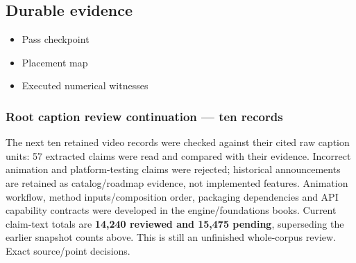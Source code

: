 \subsection{Durable evidence}\label{appendix-5056f3debc1f-durable-evidence}

\hypertarget{appendix-5056f3debc1f-durable-evidence}{}

\begin{itemize}
\tightlist
\item
  {Pass checkpoint}
\item
  {Placement map}
\item
  {Executed numerical witnesses}
\end{itemize}

\subsubsection{Root caption review continuation --- ten records}\label{appendix-5056f3debc1f-root-caption-review-continuation-ten-records}

\hypertarget{appendix-5056f3debc1f-root-caption-review-continuation-ten-records}{}

The next ten retained video records were checked against their cited raw caption units: 57 extracted claims were read and compared with their evidence. Incorrect animation and platform-testing claims were rejected; historical announcements are retained as catalog/roadmap evidence, not implemented features. Animation workflow, method inputs/composition order, packaging dependencies and API capability contracts were developed in the engine/foundations books. Current claim-text totals are \textbf{14,240 reviewed and 15,475 pending}, superseding the earlier snapshot counts above. This is still an unfinished whole-corpus review. {Exact source/point decisions}.
